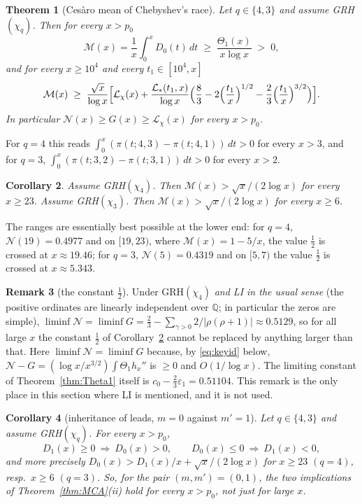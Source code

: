 \documentclass[11pt]{amsart}
\newtheorem{theorem}{Theorem}[section]
\newtheorem{corollary}[theorem]{Corollary}
\theoremstyle{definition}
\newtheorem{remark}[theorem]{Remark}
\numberwithin{equation}{section}
\newcommand{\eps}{\varepsilon}
\newcommand{\cM}{\mathcal M}          %
\newcommand{\cN}{\mathcal N}          %
\newcommand{\cL}{\mathcal L}          %
\begin{document}
\begin{theorem}[Ces\`aro mean of Chebyshev's race]\label{thm:cesaro}
Let $q\in\{4,3\}$ and assume GRH$(\chi_q)$. Then for every $x>p_0$
\[
\cM(x)=\frac1x\int_0^xD_0(t)\,dt\;\ge\;\frac{\Theta_1(x)}{x\log x}\;>\;0,
\]
and for every $x\ge10^4$ and every $t_1\in[10^4,x]$
\[
\cM(x)\;\ge\;\frac{\sqrt x}{\log x}\Bigl[\cL_\chi(x)
+\frac{\cL_*(t_1,x)}{\log x}\Bigl(\frac83-2\Bigl(\frac{t_1}x\Bigr)^{1/2}
-\frac23\Bigl(\frac{t_1}x\Bigr)^{3/2}\Bigr)\Bigr].
\]
In particular $\cN(x)\ge G(x)\ge\cL_\chi(x)$ for every $x>p_0$.
\end{theorem}

For $q=4$ this reads
$\int_0^x(\pi(t;4,3)-\pi(t;4,1))\,dt>0$ for every $x>3$, and for
$q=3$, $\int_0^x(\pi(t;3,2)-\pi(t;3,1))\,dt>0$ for every $x>2$.

\begin{corollary}\label{cor:half}
Assume GRH$(\chi_4)$. Then $\cM(x)>\sqrt x/(2\log x)$ for every
$x\ge23$. Assume GRH$(\chi_3)$. Then $\cM(x)>\sqrt x/(2\log x)$ for
every $x\ge6$.
\end{corollary}

The ranges are essentially best possible at the lower end: for $q=4$,
$\cN(19)=0.4977$ and on $[19,23)$, where $\cM(x)=1-5/x$, the value
$\tfrac12$ is crossed at $x\approx19.46$; for $q=3$,
$\cN(5)=0.4319$ and on $[5,7)$ the value $\tfrac12$ is crossed at
$x\approx5.343$.

\begin{remark}[the constant $\tfrac12$]\label{rem:halfLI}
Under GRH$(\chi_4)$ \emph{and LI in the usual sense} (the positive
ordinates are linearly independent over $\mathbb Q$; in particular
the zeros are simple),
$\liminf\cN=\liminf G=\tfrac23-\sum_{\gamma>0}2/|\rho(\rho+1)|
\approx0.5129$, so for all large $x$ the constant $\tfrac12$ of
Corollary~\ref{cor:half} cannot be replaced by anything larger than
that. Here $\liminf\cN=\liminf G$ because, by \eqref{eq:keyid}
below, $\cN-G=(\log x/x^{3/2})\int\Theta_1h_x''$ is $\ge0$ and
$O(1/\log x)$. The limiting constant of Theorem~\ref{thm:Theta1}
itself is $c_0-\tfrac23\eps_1=0.51104$. This remark is the only place
in this section where LI is mentioned, and it is not used.
\end{remark}

\begin{corollary}[inheritance of leads, $m=0$ against $m'=1$]
\label{cor:inherit}
Let $q\in\{4,3\}$ and assume GRH$(\chi_q)$. For every $x>p_0$,
\[
D_1(x)\ge0\ \Longrightarrow\ D_0(x)>0,
\qquad
D_0(x)\le0\ \Longrightarrow\ D_1(x)<0,
\]
and more precisely $D_0(x)>D_1(x)/x+\sqrt x/(2\log x)$ for $x\ge23$
$(q=4)$, resp.\ $x\ge6$ $(q=3)$. So, for the pair $(m,m')=(0,1)$,
the two implications of Theorem~\ref{thm:MCA}(ii) hold for every
$x>p_0$, not just for large $x$.
\end{corollary}
\end{document}
